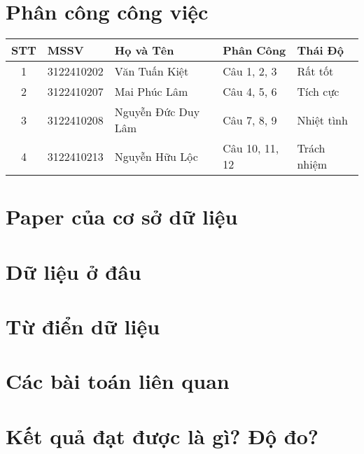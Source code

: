\documentclass{article}
\begin{document}


\newpage

\section*{Phân công công việc} %

\vspace{0.5cm} %

\begin{tabular}{|c|l|l|l|l|}
    \hline
    \textbf{STT} & \textbf{MSSV} & \textbf{Họ và Tên} & \textbf{Phân Công} & \textbf{Thái Độ} \\ \hline
    1 & 3122410202 & Văn Tuấn Kiệt & Câu 1, 2, 3 & Rất tốt \\ \hline
    2 & 3122410207 & Mai Phúc Lâm & Câu 4, 5, 6 & Tích cực \\ \hline
    3 & 3122410208 & Nguyễn Đức Duy Lâm & Câu 7, 8, 9 & Nhiệt tình \\ \hline
    4 & 3122410213 & Nguyễn Hữu Lộc & Câu 10, 11, 12 & Trách nhiệm \\ \hline
\end{tabular}

\vspace{0.5cm}

\newpage
\tableofcontents
\newpage

\section{Paper của cơ sở dữ liệu}


\section{Dữ liệu ở đâu}


\section{Từ điển dữ liệu}


\section{Các bài toán liên quan}


\section{Kết quả đạt được là gì? Độ đo?}

\end{document}
